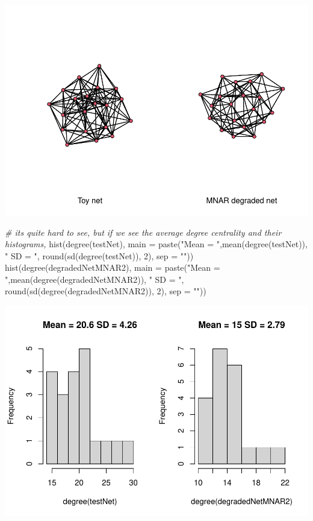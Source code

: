 \documentclass[
]{article}
\newenvironment{Shaded}{\begin{snugshade}}{\end{snugshade}}
\newcommand{\AttributeTok}[1]{\textcolor[rgb]{0.77,0.63,0.00}{#1}}
\newcommand{\CommentTok}[1]{\textcolor[rgb]{0.56,0.35,0.01}{\textit{#1}}}
\newcommand{\DecValTok}[1]{\textcolor[rgb]{0.00,0.00,0.81}{#1}}
\newcommand{\FunctionTok}[1]{\textcolor[rgb]{0.00,0.00,0.00}{#1}}
\newcommand{\NormalTok}[1]{#1}
\newcommand{\StringTok}[1]{\textcolor[rgb]{0.31,0.60,0.02}{#1}}
\begin{document}
\includegraphics{20220404_miss_data_model_files/figure-latex/example with multiple predictors-2.pdf}

\begin{Shaded}
\begin{Highlighting}[]
\CommentTok{\# it\textquotesingle{}s quite hard to see, but if we see the average degree centrality and their histograms,}
\FunctionTok{hist}\NormalTok{(}\FunctionTok{degree}\NormalTok{(testNet), }\AttributeTok{main =} \FunctionTok{paste}\NormalTok{(}\StringTok{"Mean = "}\NormalTok{,}\FunctionTok{mean}\NormalTok{(}\FunctionTok{degree}\NormalTok{(testNet)), }\StringTok{" SD = "}\NormalTok{, }\FunctionTok{round}\NormalTok{(}\FunctionTok{sd}\NormalTok{(}\FunctionTok{degree}\NormalTok{(testNet)), }\DecValTok{2}\NormalTok{), }\AttributeTok{sep =} \StringTok{""}\NormalTok{))}
\FunctionTok{hist}\NormalTok{(}\FunctionTok{degree}\NormalTok{(degradedNetMNAR2), }\AttributeTok{main =} \FunctionTok{paste}\NormalTok{(}\StringTok{"Mean = "}\NormalTok{,}\FunctionTok{mean}\NormalTok{(}\FunctionTok{degree}\NormalTok{(degradedNetMNAR2)), }\StringTok{" SD = "}\NormalTok{, }\FunctionTok{round}\NormalTok{(}\FunctionTok{sd}\NormalTok{(}\FunctionTok{degree}\NormalTok{(degradedNetMNAR2)), }\DecValTok{2}\NormalTok{), }\AttributeTok{sep =} \StringTok{""}\NormalTok{))}
\end{Highlighting}
\end{Shaded}

\includegraphics{20220404_miss_data_model_files/figure-latex/example with multiple predictors-3.pdf}
\end{document}
